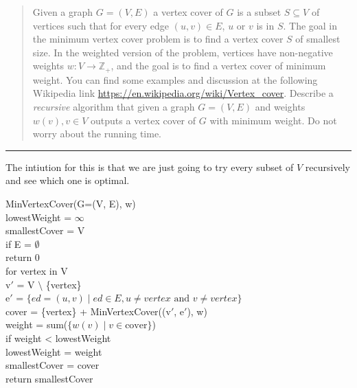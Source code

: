 \documentclass[11pt]{article}
\begin{document}



\begin{quote}
    Given a graph $G=(V,E)$ a vertex cover of $G$ is a subset
  $S \subseteq V$ of vertices such that for every edge $(u,v) \in E$,
  $u$ or $v$ is in $S$. The goal in the minimum vertex cover problem
  is to find a vertex cover $S$ of smallest size. In the weighted
  version of the problem, vertices have non-negative weights
  $w: V \rightarrow \mathbb{Z}_+$, and the goal is to find a vertex
  cover of minimum weight.  You can find some examples and discussion
  at the following Wikipedia link
  \url{https://en.wikipedia.org/wiki/Vertex_cover}.  Describe a {\em
    recursive} algorithm that given a graph $G=(V,E)$ and weights
  $w(v), v \in V$ outputs a vertex cover of $G$ with minimum
  weight. Do not worry about the running time.

\end{quote}
\hrule



\begin{solution}
    The intiution for this is that we are just going to try every subset of $V$ recursively and see which one is optimal.
    \begin{algo}
        MinVertexCover(G=(V, E), w) \+
        \\ lowestWeight = $\infty$
        \\ smallestCover = V
        \\ if E = $\emptyset$ \+
        \\      return 0 \-
        \\ for vertex in V \+
        \\      v$'$ = V $\setminus$ \{vertex\}
        \\      e$'$ = $\{ ed = (u,v) \mid ed \in E, u \neq vertex \text{ and } v \neq vertex\}$
        \\      cover = \{vertex\} + MinVertexCover((v$'$, e$'$), w)
        \\      weight = sum($\{ w(v) \mid v \in \text{cover}\}$)
        \\          if weight < lowestWeight \+
        \\               lowestWeight = weight 
        \\               smallestCover = cover \- \-
        \\ return smallestCover
    \end{algo}
\end{solution}
\end{document}
